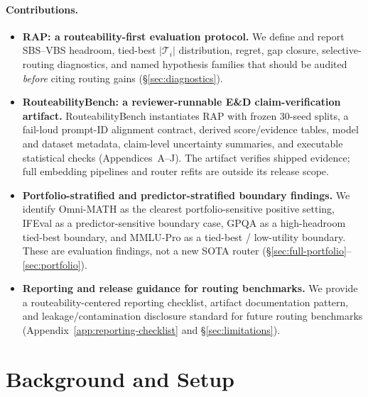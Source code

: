 \documentclass{article}
\newcommand{\tieset}{\mathcal{T}_i}
\begin{document}
\paragraph{Contributions.}
\begin{itemize}
\item[\textbf{C1}] \textbf{RAP: a routeability-first evaluation protocol.} We define and report SBS--VBS headroom, tied-best $|\tieset|$ distribution, regret, gap closure, selective-routing diagnostics, and named hypothesis families that should be audited \emph{before} citing routing gains (\S\ref{sec:diagnostics}).

\item[\textbf{C2}] \textbf{RouteabilityBench: a reviewer-runnable E\&D claim-verification artifact.} RouteabilityBench instantiates RAP with frozen 30-seed splits, a fail-loud prompt-ID alignment contract, derived score/evidence tables, model and dataset metadata, claim-level uncertainty summaries, and executable statistical checks (Appendices~A--J). The artifact verifies shipped evidence; full embedding pipelines and router refits are outside its release scope.

\item[\textbf{C3}] \textbf{Portfolio-stratified and predictor-stratified boundary findings.} We identify Omni-MATH as the clearest portfolio-sensitive positive setting, IFEval as a predictor-sensitive boundary case, GPQA as a high-headroom tied-best boundary, and MMLU-Pro as a tied-best / low-utility boundary. These are evaluation findings, not a new SOTA router (\S\ref{sec:full-portfolio}--\ref{sec:portfolio}).

\item[\textbf{C4}] \textbf{Reporting and release guidance for routing benchmarks.} We provide a routeability-centered reporting checklist, artifact documentation pattern, and leakage/contamination disclosure standard for future routing benchmarks (Appendix~\ref{app:reporting-checklist} and \S\ref{sec:limitations}).
\end{itemize}


\section{Background and Setup}
\label{sec:background}
\end{document}

